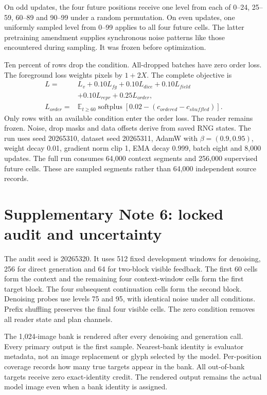 \documentclass[10pt,a4paper]{article}
\begin{document}
On odd updates, the four future positions receive one level from each of
0--24, 25--59, 60--89 and 90--99 under a random permutation. On even updates,
one uniformly sampled level from 0--99 applies to all four future cells.
The latter pretraining amendment supplies synchronous noise patterns like
those encountered during sampling. It was frozen before optimization.

Ten percent of rows drop the condition. All-dropped batches have zero order
loss. The foreground loss weights pixels by $1+2X$. The complete objective is
\begin{align}
L={}&L_v+0.10L_{fg}+0.10L_{dice}+0.10L_{field}\nonumber\\
&+0.10L_{repr}+0.25L_{order},\\
L_{order}={}&\mathbb{E}_{t\geq60}\operatorname{softplus}
\left[0.02-(c_{ordered}-c_{shuffled})\right].
\end{align}
Only rows with an available condition enter the order loss. The reader remains
frozen. Noise, drop masks and data offsets derive from saved RNG states.
The run uses seed 20265310, dataset seed 20265311, AdamW with
$\beta=(0.9,0.95)$, weight decay 0.01, gradient norm clip 1, EMA decay 0.999,
batch eight and 8,000 updates. The full run consumes 64,000 context segments
and 256,000 supervised future cells. These are sampled segments rather than
64,000 independent source records.

\section*{Supplementary Note 6: locked audit and uncertainty}
The audit seed is 20265320. It uses 512 fixed development windows for
denoising, 256 for direct generation and 64 for two-block visible feedback.
The first 60 cells form the context and the remaining four context-window
cells form the first target block. The four subsequent continuation cells
form the second block. Denoising probes use levels 75 and 95, with identical
noise under all conditions. Prefix shuffling preserves the final four visible
cells. The zero condition removes all reader state and plan channels.

The 1,024-image bank is rendered after every denoising and generation call.
Every primary output is the first sample. Nearest-bank identity is evaluator
metadata, not an image replacement or glyph selected by the model. Per-position
coverage records how many true targets appear in the bank. All out-of-bank
targets receive zero exact-identity credit. The rendered output remains the
actual model image even when a bank identity is assigned.
\end{document}
